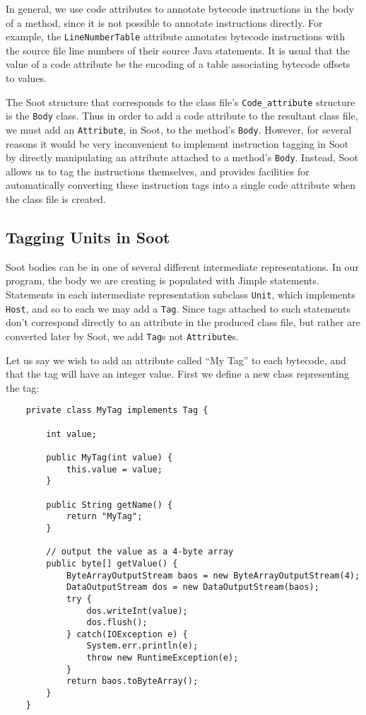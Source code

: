 \documentclass{article}
\begin{document}
In general, we use code attributes to annotate bytecode instructions in the 
body of a method, since it is not possible to annotate instructions directly. 
For example, the {\tt LineNumberTable} attribute annotates bytecode 
instructions with the source file line numbers of their source Java 
statements. It is usual that the value of a code attribute be the encoding of 
a table associating bytecode offsets to values.

The Soot structure that corresponds to the class file's {\tt Code\_attribute} 
structure is the {\tt Body} class. Thus in order to add a code attribute to 
the resultant class file, we must add an {\tt Attribute}, in Soot, to the 
method's {\tt Body}. However, for several reasons it would be very 
inconvenient to implement instruction tagging in Soot by directly manipulating 
an attribute attached to a method's {\tt Body}. Instead, Soot allows us to tag 
the instructions themselves, and provides facilities for automatically 
converting these instruction tags into a single code attribute when the class 
file is created.

\subsection{Tagging Units in Soot}

Soot bodies can be in one of several different intermediate representations. 
In our program, the body we are creating is populated with Jimple statements. 
Statements in each intermediate representation subclass {\tt Unit}, which 
implements {\tt Host}, and so to each we may add a {\tt Tag}. Since tags 
attached to such statements don't correspond directly to an attribute in the 
produced class file, but rather are converted later by Soot, we add {\tt Tag}s 
not {\tt Attribute}s.

Let us say we wish to add an attribute called ``My Tag'' to each bytecode, and 
that the tag will have an integer value. First we define a new class 
representing the tag:

\begin{verbatim}
    private class MyTag implements Tag {

        int value;

        public MyTag(int value) {
            this.value = value;
        }

        public String getName() {
            return "MyTag";
        }

        // output the value as a 4-byte array
        public byte[] getValue() {
            ByteArrayOutputStream baos = new ByteArrayOutputStream(4);
            DataOutputStream dos = new DataOutputStream(baos);
            try {
                dos.writeInt(value);
                dos.flush();
            } catch(IOException e) {
                System.err.println(e);
                throw new RuntimeException(e);
            }
            return baos.toByteArray();
        }
    }
\end{verbatim}
\end{document}
